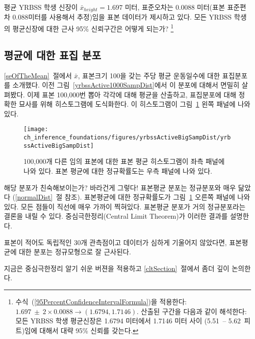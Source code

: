 \begin{exercise} \label{95CIExerciseForAgeOfYrbssSamp1}
평균 YRBSS 학생 신장이 $\bar{x}_{height} = 1.697$ 미터, 표준오차는 0.0088 미터(표본 표준편차 0.088미터를 사용해서 추정)임을 표본 데이터가 제시하고 있다. 모든 YRBSS 학생의 평균신장에 대한 근사 95\% 신뢰구간은 어떻게 되는가?
\footnote{수식~(\ref{95PercentConfidenceIntervalFormula})을 적용한다: $1.697 \ \pm \ 2\times 0.0088 \rightarrow (1.6794, 1.7146)$. 산출된 구간을 다음과 같이 해석한다: 모든 YRBSS 학생 평균신장은 1.6794 미터에서 1.7146 미터 사이 (5.51~-- 5.62~피트)임에 대해서 대략 95\% 신뢰를 갖는다.}
\end{exercise}

\subsection{평균에 대한 표집 분포}
\ref{seOfTheMean}~절에서 $\bar{x}$, 표본크기 100을 갖는 주당 평균 운동일수에 대한 표집분포를 소개했다. 이전 그림~\ref{yrbssActive1000SampDist}에서 이 분포에 대해서 면밀히 살펴봤다. 이제 표본 100,000번 뽑아 각각에 대해 평균을 산출하고, 표집분포에 대해 정확한 묘사를 위해 히스토그램에 도식화한다. 이 히스토그램이 그림~\ref{yrbssActiveBigSampDist} 왼쪽 패널에 나와있다.

\begin{figure}[hht]
   \centering
   \texttt{[image: ch\_inference\_foundations/figures/yrbssActiveBigSampDist/yrbssActiveBigSampDist]}
   \caption{100,000개 다른 임의 표본에 대한 표본 평균 히스토그램이 좌측 패널에 나와 있다. 표본 평균에 대한 정규확률도는 우측 패널에 나와 있다.}
   \label{yrbssActiveBigSampDist}
\end{figure}

해당 분포가 친숙해보이는가? 바라건게 그렇다! 표본평균 분포는 정규분포와 매우 닮았다 (\ref{normalDist}~절 참조). 표본평균에 대한 정규확률도가 그림~\ref{yrbssActiveBigSampDist} 오른쪽 패널에 나와 있다. 모든 점들이 직선에 매우 가까이 찍혀있다. 표본평균 분포가 거의 정규분포라는 결론을 내릴 수 있다. 중심극한정리(Central Limit Theorem)가 이러한 결과를 설명한다.

\begin{termBox}{
표본이 적어도 독립적인 30개 관측점이고 데이터가 심하게 기울어지 않았다면, 표본평균에 대한 분포는 정규모형으로 잘 근사된다.}
\end{termBox}

지금은 중심극한정리 알기 쉬운 버젼을 적용하고 \ref{cltSection}~절에서 좀더 깊이 논의한다.

